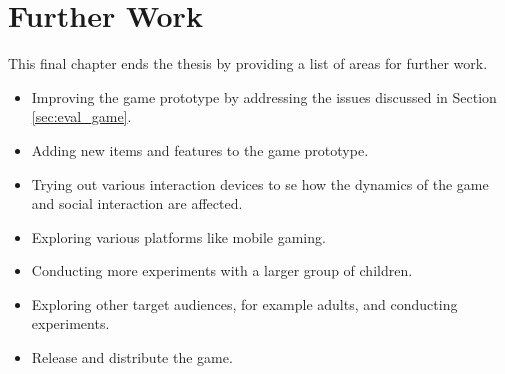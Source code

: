 \chapter{Further Work}
\label{chp:further_work}
This final chapter ends the thesis by providing a list of areas for further work.
\begin{itemize}
	\item Improving the game prototype by addressing the issues discussed in Section \ref{sec:eval_game}.
	\item Adding new items and features to the game prototype.
	\item Trying out various interaction devices to se how the dynamics of the game and social interaction are affected.
	\item Exploring various platforms like mobile gaming.
	\item Conducting more experiments with a larger group of children.
	\item Exploring other target audiences, for example adults, and conducting experiments.
	\item Release and distribute the game.
\end{itemize}

